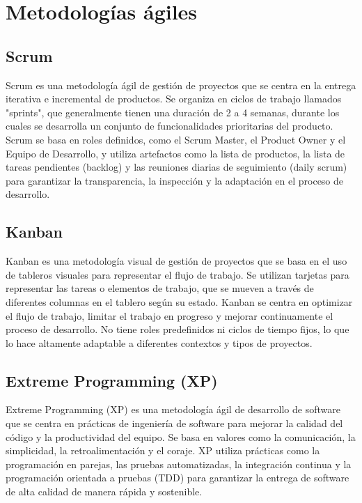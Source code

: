 \section{Metodologías ágiles}

\subsection{Scrum}
Scrum es una metodología ágil de gestión de proyectos que se centra en la entrega iterativa e incremental de productos. Se organiza en ciclos de trabajo llamados "sprints", que generalmente tienen una duración de 2 a 4 semanas, durante los cuales se desarrolla un conjunto de funcionalidades prioritarias del producto. Scrum se basa en roles definidos, como el Scrum Master, el Product Owner y el Equipo de Desarrollo, y utiliza artefactos como la lista de productos, la lista de tareas pendientes (backlog) y las reuniones diarias de seguimiento (daily scrum) para garantizar la transparencia, la inspección y la adaptación en el proceso de desarrollo.

\subsection{Kanban}
	Kanban es una metodología visual de gestión de proyectos que se basa en el uso de tableros visuales para representar el flujo de trabajo. Se utilizan tarjetas para representar las tareas o elementos de trabajo, que se mueven a través de diferentes columnas en el tablero según su estado. Kanban se centra en optimizar el flujo de trabajo, limitar el trabajo en progreso y mejorar continuamente el proceso de desarrollo. No tiene roles predefinidos ni ciclos de tiempo fijos, lo que lo hace altamente adaptable a diferentes contextos y tipos de proyectos.

\subsection{Extreme Programming (XP)}
	Extreme Programming (XP) es una metodología ágil de desarrollo de software que se centra en prácticas de ingeniería de software para mejorar la calidad del código y la productividad del equipo. Se basa en valores como la comunicación, la simplicidad, la retroalimentación y el coraje. XP utiliza prácticas como la programación en parejas, las pruebas automatizadas, la integración continua y la programación orientada a pruebas (TDD) para garantizar la entrega de software de alta calidad de manera rápida y sostenible.


